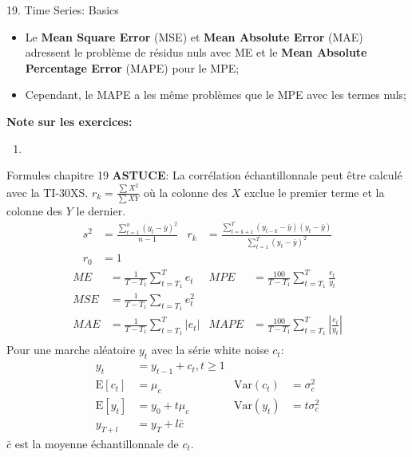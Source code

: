 \documentclass[12pt, titlepage, french]{report}
\begin{document}
\begin{CHPT_SUMM}{19. Time Series: Basics}
\begin{enumerate}
\begin{itemize}
		\item	Le \textbf{Mean Square Error} (MSE) et \textbf{Mean Absolute Error} (MAE) adressent le problème de résidus nuls avec ME et le \textbf{Mean Absolute Percentage Error} (MAPE) pour le MPE;
		\item	Cependant, le MAPE a les même problèmes que le MPE avec les termes nuls;
	\end{itemize}
\end{enumerate}
\textbf{Note sur les exercices:} 
\begin{enumerate}
	\item	
\end{enumerate}
\end{CHPT_SUMM}

\begin{FORMULA_SUMM}{Formules chapitre 19}
\textbf{ASTUCE}: La corrélation échantillonnale peut être calculé avec la TI-30XS. $r_{k} = \frac{\sum X^{2}}{\sum XY}$ où la colonne des $X$ exclue le  premier terme et la colonne des $Y$ le dernier.
\begin{align*}
	s^{2}	&=	\frac{\sum_{t = 1}^{n}(y_{t} - \bar{y})^{2}}{n - 1}	&
	r_{k}	&=	\frac{\sum_{t = k + 1}^{T}(y_{t - k} - \bar{y})(y_{t} - \bar{y})}{\sum_{t = 1}^{T}(y_{t} - \bar{y})^{2}}	\\
	r_{0}	&=	1
\end{align*}
\begin{align*}
	ME	&=	\frac{1}{T - T_{1}} \sum_{t = T_{1}}^{T} e_{t}	&
	MPE	&=	\frac{100}{T - T_{1}} \sum_{t = T_{1}}^{T} \frac{e_{t}}{y_{t}}	\\
	MSE	&=	\frac{1}{T - T_{1}} \sum_{t = T_{1}} e_{t}^{2}	\\
	MAE	&=	\frac{1}{T - T_{1}} \sum_{t = T_{1}}^{T} |e_{t}|	&	
	MAPE	&=	\frac{100}{T - T_{1}} \sum_{t = T_{1}}^{T} \left| \frac{e_{t}}{y_{t}}\right|	\\
\end{align*}
Pour une marche aléatoire $y_{t}$ avec la série white noise $c_{t}$:
\begin{align*}
	y_{t}	&= 	y_{t - 1} + c_{t},	t \ge 1	\\
	\text{E}[c_{t}]	&=	\mu_{c}	&
	\text{Var}(c_{t})	&=	\sigma^{2}_{c}	\\
	\text{E}[y_{t}]	&=	y_{0} + t \mu_{c}	&
	\text{Var}(y_{t})	&=	t \sigma^{2}_{c}	\\	
	y_{T + l}	&= 	y_{T} + l \bar{c}	
\end{align*}
$\bar{c}$ est la moyenne échantillonnale de $c_{t}$.


\end{FORMULA_SUMM}
\end{document}
